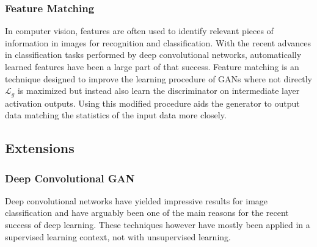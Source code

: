 


\subsubsection{Feature Matching}
\label{ssub:gan_feature_matching}
In computer vision, features are often used to identify relevant pieces of information in images for recognition and classification.
With the recent advances in classification tasks performed by deep convolutional networks, automatically learned features have been a large part of that success.
Feature matching is an technique designed to improve the learning procedure of GANs where not directly $\mathcal{L}_g$ is maximized but instead also learn the discriminator on intermediate layer activation outputs.
Using this modified procedure aids the generator to output data matching the statistics of the input data more closely.






\subsection{Extensions}
\label{sub:gan_extensions}

\subsubsection{Deep Convolutional GAN}
\label{ssub:dcgan}
Deep convolutional networks\cite{lecun-89e} have yielded impressive results for image classification \cite{imagenet:2012} and have arguably been one of the main reasons for the recent success of deep learning.
These techniques however have mostly been applied in a supervised learning context, not with unsupervised learning.

